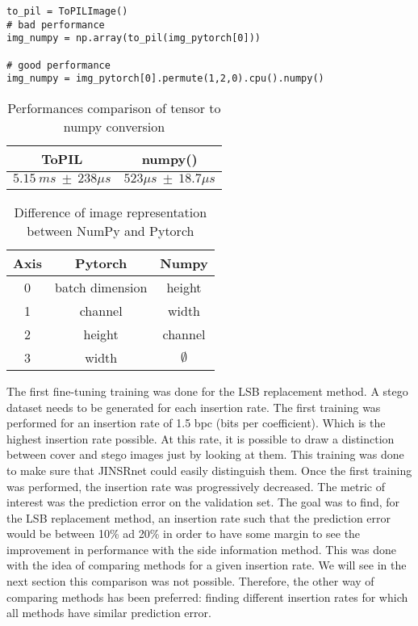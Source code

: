 \documentclass[12pt]{article}
\begin{document}
\begin{lstlisting}[caption={Conversion of pytorch tensors into numpy images}, label={lst:example}]
to_pil = ToPILImage()
# bad performance
img_numpy = np.array(to_pil(img_pytorch[0]))

# good performance
img_numpy = img_pytorch[0].permute(1,2,0).cpu().numpy() 
\end{lstlisting}

\begin{table}[H]
    \centering
    \begin{tabular}{|c|c|}
        \hline
        ToPIL & numpy()\\
        \hline
        $5.15\ ms\ \pm\ 238 \mu s$  & $523 \mu s\ \pm\ 18.7 \mu s  $\\
        \hline
    \end{tabular}
    \caption[Performances comparison of tensor to numpy conversion]{Performances comparison of tensor to numpy conversion}
    \label{tab:torch2np}
\end{table}

\begin{table}[H]
    \centering
\begin{tabular}{|c|c|c|}
    \hline
    Axis & Pytorch & Numpy \\
    \hline
    0 & batch dimension & height \\
    \hline
    1 & channel & width\\
    \hline
    2 & height & channel\\
    \hline
    3 & width & $\emptyset$\\
    \hline
\end{tabular}    
\caption[Difference of image representation between NumPy and Pytorch]{Difference of image representation between NumPy and Pytorch}
\end{table}
The first fine-tuning training was done for the LSB replacement method. A stego dataset needs to be generated for each insertion rate. The first training was performed for an insertion rate of 1.5 bpc (bits per coefficient). Which is the highest insertion rate possible. At this rate, it is possible to draw a distinction between cover and stego images just by looking at them. This training was done to make sure that JINSRnet could easily distinguish them. Once the first training was performed, the insertion rate was progressively decreased. The metric of interest was the prediction error on the validation set. The goal was to find, for the LSB replacement method, an insertion rate such that the prediction error would be between 10\% ad 20\% in order to have some margin to see the improvement in performance with the side information method. This was done with the idea of comparing methods for a given insertion rate. We will see in the next section this comparison was not possible. Therefore, the other way of comparing methods has been preferred: finding different insertion rates for which all methods have similar prediction error.
\end{document}

